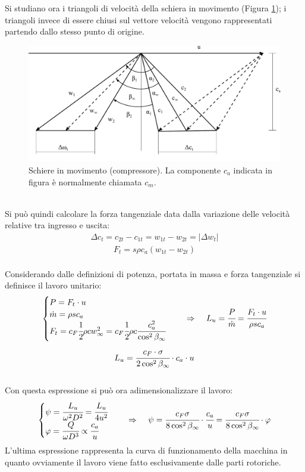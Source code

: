 Si studiano ora i triangoli di velocità della schiera in movimento (Figura \ref{fig:SchiereCompr}); i triangoli invece di essere chiusi sul vettore velocità vengono rappresentati partendo dallo stesso punto di origine. 
\begin{figure}
\centering
  \includegraphics[width=\textwidth]{fig/SchiereCompr.pdf}
\caption{Schiere in movimento (compressore). La componente $c_a$ indicata in figura è normalmente chiamata $c_m$.}
\label{fig:SchiereCompr}
\end{figure}
\\Si può quindi calcolare la forza tangenziale data dalla variazione delle velocità relative tra ingresso e uscita:
\begin{align*}
\Delta c_t = c_{2t} - c_{1t} = w_{1t} - w_{2t} = |\Delta w_t |
\end{align*}
\begin{align*}
F_t = s \rho c_a (w_{1t} - w_{2t})
\end{align*}
\\Considerando dalle definizioni di potenza, portata in massa e forza tangenziale si definisce il lavoro unitario:
\begin{align*}
\begin{cases}
P=F_t \cdot u\\
\dot{m} = \rho s c_a\\
F_t = c_F \cfrac{1}{2} \rho c w_{\infty}^2 = c_F \cfrac{1}{2} \rho c \cfrac{c_a^2}{\cos^2 \beta_{\infty}}
\end{cases} \;\;\;\;
\Rightarrow \;\;\;\;
L_u = \cfrac{P}{\dot{m}}= \cfrac{F_t \cdot u}{\rho s c_a}
\end{align*}
\begin{align*}
L_u = \cfrac{c_F \cdot \sigma}{2 \cos^2 \beta_{\infty}} \cdot c_a \cdot u
\end{align*}
\\Con questa espressione si può ora adimensionalizzare il lavoro:
\begin{align*}
\begin{cases}
\psi = \cfrac{L_u}{\omega ^2 D^2} = \cfrac{L_u}{4 u^2}\\
\varphi = \cfrac{Q}{\omega D^3} \propto \cfrac{c_a}{u}
\end{cases} \;\;\;\;
\Rightarrow \;\;\;\;
\psi = \cfrac{c_F \sigma}{8 \cos^2 \beta_{\infty}} \cdot \cfrac{c_a}{u} = \cfrac{c_F \sigma}{8 \cos^2 \beta_{\infty}} \cdot \varphi
\end{align*}
L'ultima espressione rappresenta la curva di funzionamento della macchina in quanto ovviamente il lavoro viene fatto esclusivamente dalle parti rotoriche.

